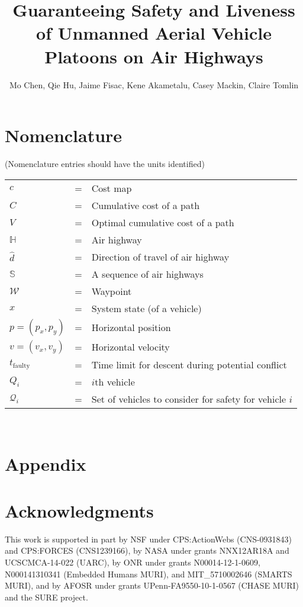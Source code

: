 \documentclass[submit]{aiaa-pretty}
\author{Mo Chen, Qie Hu, Jaime Fisac, Kene Akametalu, Casey Mackin, Claire Tomlin}
\title{Guaranteeing Safety and Liveness of Unmanned Aerial Vehicle Platoons on Air Highways}
\newcommand{\pos}{p} %
\newcommand{\vel}{v} %
\newcommand{\hw}{\mathbb{H}} %
\newcommand{\hws}{\mathbb{S}} %
\newcommand{\hwd}{\hat{d}}
\newcommand{\wpt}{\mathcal{W}}
\newcommand{\cmap}{c}
\newcommand{\ccost}{C}
\newcommand{\ocost}{V}
\newcommand{\td}{t_\text{faulty}} %
\newcommand{\veh}[1]{Q_{#1}}
\newcommand{\vehSCS}[1]{\mathcal{Q}_{#1}} %
\begin{document}
\maketitle

\section*{Nomenclature}
(Nomenclature entries should have the units identified)\\
\noindent\begin{tabular}{@{}lcl@{}}
$\cmap$ &=& Cost map \\
$\ccost$ &=& Cumulative cost of a path \\
$\ocost$ &=& Optimal cumulative cost of a path \\
$\hw$ &=& Air highway \\
$\hwd$ &=& Direction of travel of air highway \\
$\hws$ &=& A sequence of air highways \\
$\wpt$ &=& Waypoint \\
$x$ &=& System state (of a vehicle) \\
$\pos=(\pos_x, \pos_y)$ &=& Horizontal position \\
$\vel=(\vel_x, \vel_y)$ &=& Horizontal velocity \\
$\td$ &=& Time limit for descent during potential conflict \\
$\veh{i}$ &=& $i$th vehicle \\
$\vehSCS{i}$ &=& Set of vehicles to consider for safety for vehicle $i$
\end{tabular} \\















\section*{Appendix}

\section*{Acknowledgments}
This work is supported in part by NSF under CPS:ActionWebs (CNS-0931843) and CPS:FORCES (CNS1239166), by NASA under grants NNX12AR18A and UCSCMCA-14-022 (UARC), by ONR under grants N00014-12-1-0609, N000141310341 (Embedded Humans MURI), and MIT\_5710002646 (SMARTS MURI), and by AFOSR under grants UPenn-FA9550-10-1-0567 (CHASE MURI) and the SURE project.



\end{document}
